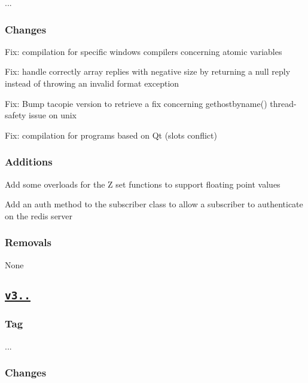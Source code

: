 {..}. \subsubsection*{Changes}


\begin{DoxyItemize}
\item Fix\+: compilation for specific windows compilers concerning atomic variables
\item Fix\+: handle correctly array replies with negative size by returning a null reply instead of throwing an invalid format exception
\item Fix\+: Bump tacopie version to retrieve a fix concerning gethostbyname() thread-\/safety issue on unix
\item Fix\+: compilation for programs based on Qt (\textquotesingle{}slots\textquotesingle{} conflict) \subsubsection*{Additions}
\end{DoxyItemize}


\begin{DoxyItemize}
\item Add some overloads for the Z set functions to support floating point values
\item Add an auth method to the subscriber class to allow a subscriber to authenticate on the redis server \subsubsection*{Removals}
\end{DoxyItemize}

None

\subsection*{\href{https://github.com/Cylix/cpp_redis/releases/tag/3.0.0}{\tt v3..}}

\subsubsection*{Tag}

{..}. \subsubsection*{Changes}


